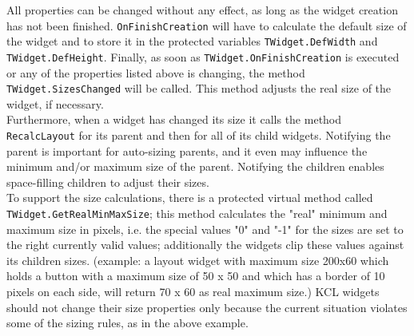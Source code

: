 All properties can be changed without any effect, as long as the widget creation
has not been finished. \texttt{OnFinishCreation} will have to calculate the
default size of the widget and to store it in the protected variables
\texttt{TWidget.DefWidth} and \texttt{TWidget.DefHeight}.
Finally, as soon as \texttt{TWidget.\-OnFinishCreation} is executed or any of the
properties listed above is changing, the method \texttt{TWidget.SizesChanged}
will be called. This method adjusts the real size of the widget, if necessary.
\\ Furthermore, when a widget has changed its size it calls the method
\texttt{RecalcLayout} for its parent and then for all of its child widgets.
Notifying the parent is important for auto-sizing parents, and it even may
influence the minimum and/or maximum size of the parent. Notifying the children
enables space-filling children to adjust their sizes.
\\ To support the size calculations, there is a protected virtual method called
\texttt{TWidget.\-GetReal\-MinMaxSize}; this method calculates the "real" minimum
and maximum size in pixels, i.e. the special values "0" and "-1" for the sizes
are set to the right currently valid values; additionally the widgets clip these
values against its children sizes. (example: a layout widget with maximum size
200x60 which holds a button with a maximum size of 50 x 50 and which has a
border of 10 pixels on each side, will return 70 x 60 as real maximum size.)
KCL widgets should not change their size properties only because the current
situation violates some of the sizing rules, as in the above example.